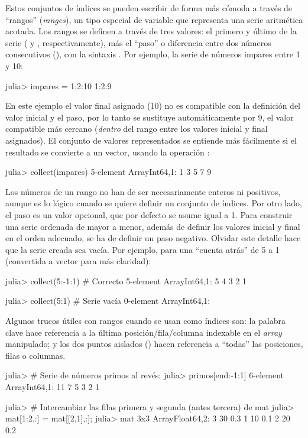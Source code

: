 Estos conjuntos de índices se pueden escribir de forma más cómoda a través de ``rangos'' (\emph{ranges}), un tipo especial de variable que representa una serie aritmética acotada. Los rangos se definen a través de tres valores: el primero y último de la serie ( y , respectivamente), más el ``paso'' o diferencia entre dos números consecutivos (), con la sintaxis . Por ejemplo, la serie de números impares entre 1 y 10:

\begin{jlconcode}
julia> impares = 1:2:10
1:2:9
\end{jlconcode}
En este ejemplo el valor final asignado (10) no es compatible con la definición del valor inicial y el paso, por lo tanto se sustituye automáticamente por 9, el valor compatible más cercano (\emph{dentro} del rango entre los valores inicial y final asignados). El conjunto de valores representados se entiende más fácilmente si el resultado se convierte a un vector, usando la operación :

\begin{jlconcode}
julia> collect(impares)
5-element Array{Int64,1}:
 1
 3
 5
 7
 9
\end{jlconcode}

Los números de un rango no han de ser necesariamente enteros ni positivos, aunque es lo lógico cuando se quiere definir un conjunto de índices. Por otro lado, el paso  es un valor opcional, que por defecto se asume igual a 1. Para construir una serie ordenada de mayor a menor, además de definir los valores inicial y final en el orden adecuado, se ha de definir un paso negativo. Olvidar este detalle hace que la serie creada sea vacía. Por ejemplo, para una ``cuenta atrás'' de 5 a 1 (convertida a vector para más claridad):

\begin{jlconcode}
julia> collect(5:-1:1) # Correcto
5-element Array{Int64,1}:
 5
 4
 3
 2
 1 

julia> collect(5:1) # Serie vacía
0-element Array{Int64,1}:
\end{jlconcode}

Algunos trucos útiles con rangos cuando se usan como índices son: la palabra clave  hace referencia a la última posición/fila/columna indexable en el \emph{array} manipulado; y los dos puntos aislados (\jl{:}) hacen referencia a ``todas'' las posiciones, filas o columnas.

\begin{jlconcode}
julia> # Serie de números primos al revés:
julia> primos[end:-1:1]
6-element Array{Int64,1}:
 11
 7
 5
 3
 2
 1

julia> # Intercambiar las filas primera y segunda (antes tercera) de mat
julia> mat[1:2,:] = mat[[2,1],:];
julia> mat
3x3 Array{Float64,2}:
 3 30 0.3
 1 10 0.1
 2 20 0.2
\end{jlconcode}

